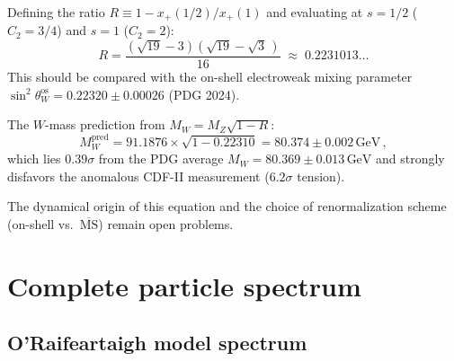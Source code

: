 \documentclass[12pt,a4paper]{article}
\newcommand{\GeV}{\,\text{GeV}}
\begin{document}
Defining the ratio
$R \equiv 1 - x_+(1/2)/x_+(1)$ and evaluating at
$s = 1/2$ ($C_2 = 3/4$) and $s = 1$ ($C_2 = 2$):
\begin{equation}
R = \frac{(\sqrt{19} - 3)(\sqrt{19} - \sqrt{3}\,)}{16}
  \;\approx\; 0.2231013\ldots
\end{equation}
This should be compared with the on-shell electroweak mixing
parameter $\sin^2\!\theta_W^{\text{os}} = 0.22320 \pm 0.00026$
(PDG 2024).

The $W$-mass prediction from $M_W = M_Z\sqrt{1 - R}$:
\begin{equation}
M_W^{\text{pred}}
  = 91.1876 \times \sqrt{1 - 0.22310}
  = 80.374 \pm 0.002\GeV\,,
\end{equation}
which lies $0.39\sigma$ from the PDG average
$M_W = 80.369 \pm 0.013\GeV$ and strongly disfavors the
anomalous CDF-II measurement ($6.2\sigma$ tension).

The dynamical origin of this equation and the choice of
renormalization scheme (on-shell vs.\ $\overline{\text{MS}}$)
remain open problems.


\section{Complete particle spectrum}
\label{sec:spectrum}

\subsection{O'Raifeartaigh model spectrum}
\end{document}
